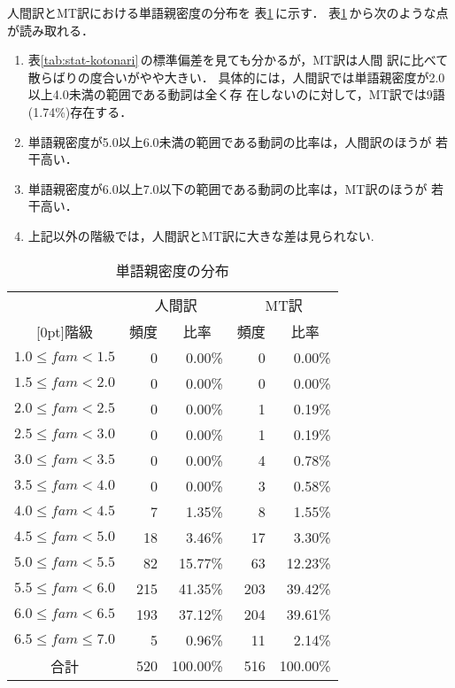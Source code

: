 人間訳とMT訳における単語親密度の分布を
表\ref{tab:fam-histgram-kotonari}\,に示す．
表\ref{tab:fam-histgram-kotonari}\,から次のような点が読み取れる．
\begin{enumerate}
\item 表\ref{tab:stat-kotonari}\,の標準偏差を見ても分かるが，MT訳は人間
訳に比べて散らばりの度合いがやや大きい． 
具体的には，人間訳では単語親密度が2.0以上4.0未満の範囲である動詞は全く存
在しないのに対して，MT訳では9語(1.74\%)存在する．
\item 単語親密度が5.0以上6.0未満の範囲である動詞の比率は，人間訳のほうが
若干高い．
\item 単語親密度が6.0以上7.0以下の範囲である動詞の比率は，MT訳のほうが
若干高い．
\item 上記以外の階級では，人間訳とMT訳に大きな差は見られない.
\end{enumerate}
\begin{table}[htbp]
\caption{単語親密度の分布} 
\label{tab:fam-histgram-kotonari}
\begin{center}
\begin{tabular}{|c||r|r|r|r|}\hline
& \multicolumn{2}{c|}{人間訳} & \multicolumn{2}{c|}{MT訳} \\\cline{2-5}
\raisebox{1.5ex}[0pt]{階級} & \multicolumn{1}{c|}{頻度} & \multicolumn{1}{c|}{比率} & 
\multicolumn{1}{c|}{頻度} & \multicolumn{1}{c|}{比率} \\\hline \hline
$1.0 \le fam < 1.5$   &   0 &   0.00\% &   0 &   0.00\% \\
$1.5 \le fam < 2.0$   &   0 &   0.00\% &   0 &   0.00\% \\
$2.0 \le fam < 2.5$   &   0 &   0.00\% &   1 &   0.19\% \\
$2.5 \le fam < 3.0$   &   0 &   0.00\% &   1 &   0.19\% \\
$3.0 \le fam < 3.5$   &   0 &   0.00\% &   4 &   0.78\% \\
$3.5 \le fam < 4.0$   &   0 &   0.00\% &   3 &   0.58\% \\
$4.0 \le fam < 4.5$   &   7 &   1.35\% &   8 &   1.55\% \\
$4.5 \le fam < 5.0$   &  18 &   3.46\% &  17 &   3.30\% \\
$5.0 \le fam < 5.5$   &  82 &  15.77\% &  63 &  12.23\% \\
$5.5 \le fam < 6.0$   & 215 &  41.35\% & 203 &  39.42\% \\
$6.0 \le fam < 6.5$   & 193 &  37.12\% & 204 &  39.61\% \\
$6.5 \le fam \le 7.0$ &   5 &   0.96\% &  11 &   2.14\% \\\hline
合計                  & 520 & 100.00\% & 516 & 100.00\% \\\hline
\end{tabular}
\end{center}
\end{table}

